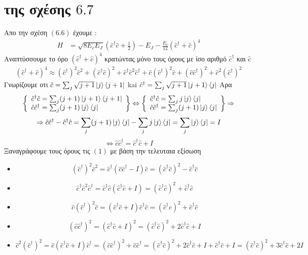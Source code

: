 \documentclass[12pt]{article}
\begin{document}
\section*{{ της σχέσης $6.7$}}
    Απο την σχέση $(6.6)$ έχουμε :
        \begin{align*}
            H &= \sqrt{8E_cE_J}\left(\hat{c}^\dag \hat{c}+\frac{1}{2}\right) - E_J - \frac{E_c}{12}\left(\hat{c}^\dag+\hat{c}\right)^4   
        \end{align*}
        Αναπτύσσουμε το όρο $\left(\hat{c}^\dag+\hat{c}\right)^4$  κρατώντας μόνο τους όρους με ίσο αριθμό $\hat{c}^\dag$ και $\hat{c}$
        \begin{align*}\left(\hat{c}^\dag+\hat{c}\right)^4 \approx \left(\hat{c}^\dag\right)^2\hat{c}^2 + \left(\hat{c}^\dag\hat{c}\right)^2 + \hat{c}^\dag\hat{c}^2\hat{c}^\dag +  \hat{c}\left(\hat{c}^\dag \right)^2\hat{c}+ \left(\hat{c}\hat{c}^\dag\right)^2+\hat{c}^2\left(\hat{c}^\dag\right)^2 \tag{1}\end{align*}
        Γνωρίζουμε οτι $\hat{c} = \sum_j\sqrt{j+1}\ket{j}\bra{j+1}$ kai $\hat{c}^\dag = \sum_j\sqrt{j+1}\ket{j+1}\bra{j}$ 
        Αρα 
        $$
 \left\{
\begin{array}{lr}
    \hat{c}^\dag\hat{c} = \sum_j(j+1)\ket{j+1}\bra{j+1}\\
    \hat{c}\hat{c}^\dag = \sum_j(j+1)\ket{j}\bra{j}
\end{array}
\right\} \Leftrightarrow 
\left\{
    \begin{array}{lr}
        \hat{c}^\dag\hat{c} = \sum_jj\ket{j}\bra{j}\\
        \hat{c}\hat{c}^\dag = \sum_j(j+1)\ket{j}\bra{j}
    \end{array}
    \right\} \Rightarrow 
$$
$$\Rightarrow \hat{c}\hat{c}^\dag - \hat{c}^\dag\hat{c} = \sum_j(j+1)\ket{j}\bra{j} - \sum_jj\ket{j}\bra{j} = \sum_j\ket{j}\bra{j} = I$$ $$ \Leftrightarrow \hat{c}\hat{c}^\dag = \hat{c}^\dag\hat{c} +I $$
Ξαναγράφουμε τους όρους τις $(1)$ με βάση την τελευταια εξίσωση
\begin{itemize}
    \item $$\left(\hat{c}^\dag\right)^2\hat{c}^2 = \hat{c}^\dag \left(\hat{c}\hat{c}^\dag -I\right)\hat{c} =  \left(\hat{c}^\dag\hat{c}\right)^2 -\hat{c}^\dag\hat{c}$$
    \item $$\hat{c}^\dag\hat{c}^2\hat{c}^\dag  = \hat{c}^\dag \hat{c}\left(\hat{c}^\dag\hat{c} +I\right) =  \left(\hat{c}^\dag\hat{c}\right)^2 +\hat{c}^\dag\hat{c}$$
    \item $$\hat{c}\left(\hat{c}^\dag \right)^2\hat{c}  =\left(\hat{c}^\dag\hat{c} +I\right) \hat{c}^\dag \hat{c} =  \left(\hat{c}^\dag\hat{c}\right)^2 +\hat{c}^\dag\hat{c}$$
    \item $$\left(\hat{c}\hat{c}^\dag\right)^2  =\left(\hat{c}^\dag\hat{c} +I\right)^2  =  \left(\hat{c}^\dag\hat{c}\right)^2 +2\hat{c}^\dag\hat{c}+I$$
    \item $$\hat{c}^2\left(\hat{c}^\dag\right)^2  =\hat{c} \left(\hat{c}^\dag\hat{c} +I\right)\hat{c}^\dag =  \left(\hat{c}\hat{c}^\dag\right)^2 +\hat{c}\hat{c}^\dag= \left(\hat{c}^\dag\hat{c}\right)^2 +2\hat{c}^\dag\hat{c}+I +\hat{c}^\dag\hat{c} +I = \left(\hat{c}^\dag\hat{c}\right)^2 +3\hat{c}^\dag\hat{c} +2I$$
\end{itemize}
\end{document}
